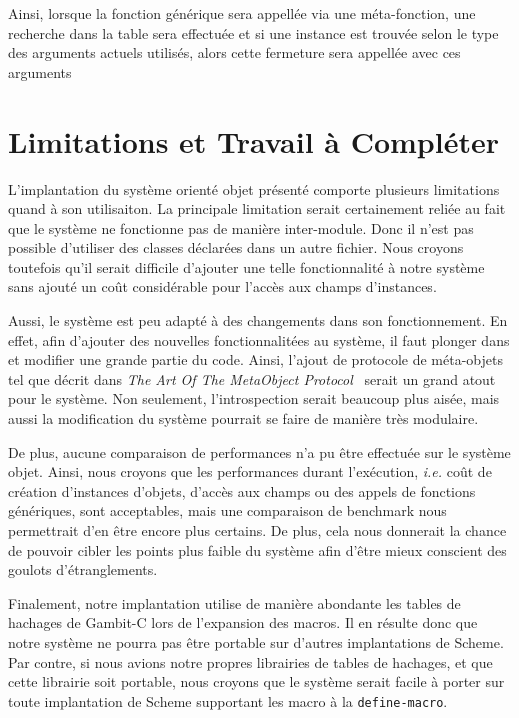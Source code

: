       Ainsi, lorsque la fonction générique sera appellée via une
      méta-fonction, une recherche dans la table sera effectuée et si
      une instance est trouvée selon le type des arguments actuels
      utilisés, alors cette fermeture sera appellée avec ces arguments
    

\clearpage


 
\section{Limitations et Travail à Compléter}
  L'implantation du système orienté objet présenté comporte plusieurs
  limitations quand à son utilisaiton. La principale limitation serait
  certainement reliée au fait que le système ne fonctionne pas de
  manière inter-module. Donc il n'est pas possible d'utiliser des
  classes déclarées dans un autre fichier. Nous croyons toutefois
  qu'il serait difficile d'ajouter une telle fonctionnalité à notre
  système sans ajouté un coût considérable pour l'accès aux champs
  d'instances.

  Aussi, le système est peu adapté à des changements dans son
  fonctionnement. En effet, afin d'ajouter des nouvelles
  fonctionnalitées au système, il faut plonger dans et modifier une
  grande partie du code. Ainsi, l'ajout de protocole de méta-objets
  tel que décrit dans \textit{The Art Of The MetaObject
    Protocol}~\cite{AOMOP} serait un grand atout pour le système. Non
  seulement, l'introspection serait beaucoup plus aisée, mais aussi la
  modification du système pourrait se faire de manière très modulaire.

  De plus, aucune comparaison de performances n'a pu être effectuée
  sur le système objet. Ainsi, nous croyons que les performances
  durant l'exécution, \textit{i.e.} coût de création d'instances
  d'objets, d'accès aux champs ou des appels de fonctions génériques,
  sont acceptables, mais une comparaison de \og benchmark \fg nous
  permettrait d'en être encore plus certains. De plus, cela nous
  donnerait la chance de pouvoir cibler les points plus faible du
  système afin d'être mieux conscient des goulots d'étranglements.

  Finalement, notre implantation utilise de manière abondante les
  tables de hachages de Gambit-C lors de l'expansion des macros. Il en
  résulte donc que notre système ne pourra pas être portable sur
  d'autres implantations de Scheme. Par contre, si nous avions notre
  propres librairies de tables de hachages, et que cette librairie
  soit portable, nous croyons que le système serait facile à porter
  sur toute implantation de Scheme supportant les macro à la
  \texttt{define-macro}.

